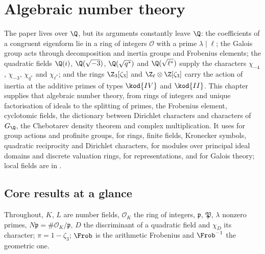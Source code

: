 \chapter{Algebraic number theory}\label{ch:ant}

The paper lives over $\Q$, but its arguments constantly leave $\Q$: the coefficients of a congruent eigenform lie in a ring of integers $\mathcal O$ with a prime
$\lambda\mid\ell$; the Galois group acts through decomposition and inertia groups and Frobenius elements; the quadratic fields $\Q(i)$, $\Q(\sqrt{-3})$,
$\Q(\sqrt{q^*})$ and $\Q(\sqrt{\ell^*})$ supply the characters $\chi_{-4}$, $\chi_{-3}$, $\chi_{q^*}$ and $\chi_{\ell^*}$; and the rings $\Z_3[\zeta_3]$ and
$\Z_\ell\otimes\Z[\zeta_3]$ carry the action of inertia at the additive primes of types $\kod{IV}$ and $\kod{II}$. This chapter supplies that algebraic number
theory, from rings of integers and unique factorisation of ideals to the splitting of primes, the Frobenius element, cyclotomic fields, the dictionary
between Dirichlet characters and characters of $G_\Q$, the Chebotarev density theorem and complex multiplication. It uses  for group actions
and profinite groups,  for rings, finite fields, Kronecker symbols, quadratic reciprocity and Dirichlet characters,  for modules
over principal ideal domains and discrete valuation rings,  for representations, and  for Galois theory; local fields are in
.

\section*{Core results at a glance}

Throughout, $K$, $L$ are number fields, $\mathcal O_K$ the ring of integers, $\mathfrak p$, $\mathfrak P$, $\lambda$ nonzero primes, $N\mathfrak p=\#\mathcal O_K/\mathfrak p$,
$D$ the discriminant of a quadratic field and $\chi_D$ its character; $\pi=1-\zeta_3$; $\Frob$ is the arithmetic Frobenius and $\Frob^{-1}$ the geometric one.

